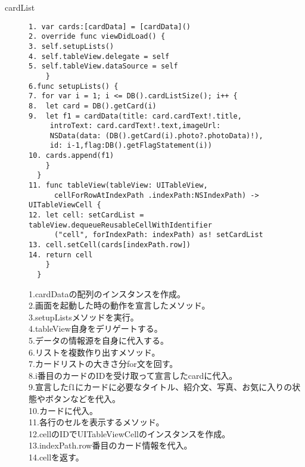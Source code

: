 \begin{description}
\item[cardList]\mbox{} 
\begin{lstlisting}[basicstyle=\ttfamily\footnotesize, frame=single]
1. var cards:[cardData] = [cardData]()
2. override func viewDidLoad() {
3. self.setupLists()
4. self.tableView.delegate = self
5. self.tableView.dataSource = self
    }
6.func setupLists() {
7. for var i = 1; i <= DB().cardListSize(); i++ {
8.  let card = DB().getCard(i)
9.  let f1 = cardData(title: card.cardText!.title,
     introText: card.cardText!.text,imageUrl: 
     NSData(data: (DB().getCard(i).photo?.photoData)!),
     id: i-1,flag:DB().getFlagStatement(i))
10. cards.append(f1)
    }
  }
11. func tableView(tableView: UITableView, 
      cellForRowAtIndexPath .indexPath:NSIndexPath) -> UITableViewCell {
12. let cell: setCardList = tableView.dequeueReusableCellWithIdentifier
      ("cell", forIndexPath: indexPath) as! setCardList
13. cell.setCell(cards[indexPath.row])
14. return cell
    }
  }
 \end{lstlisting}

1.cardDataの配列のインスタンスを作成。\\
2.画面を起動した時の動作を宣言したメソッド。\\
3.setupListsメソッドを実行。\\
4.tableView自身をデリゲートする。\\
5.データの情報源を自身に代入する。\\
6.リストを複数作り出すメソッド。\\
7.カードリストの大きさ分for文を回す。\\
8.i番目のカードのIDを受け取って宣言したcardに代入。\\
9.宣言したf1にカードに必要なタイトル、紹介文、写真、お気に入りの状態やボタンなどを代入。\\
10.カードに代入。\\
11.各行のセルを表示するメソッド。\\
12.cellのIDでUITableViewCellのインスタンスを作成。\\
13.indexPath.row番目のカード情報を代入。\\
14.cellを返す。

\end{description}

